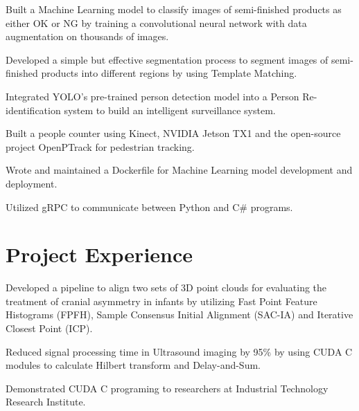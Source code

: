 \documentclass[]{deedy-resume}
\begin{document}
\begin{minipage}[t]{0.66\textwidth}
\begin{tightemize}
\item Built a Machine Learning model to classify images of semi-finished products as either OK or NG 
by training a convolutional neural network with data augmentation on thousands of images.
\item Developed a simple but effective segmentation process to segment images of semi-finished products into different regions by using Template Matching.
\item Integrated YOLO's pre-trained person detection model into a Person Re-identification system to build an intelligent surveillance system.
\item Built a people counter using Kinect, NVIDIA Jetson TX1 and the open-source project OpenPTrack for pedestrian tracking.
\item Wrote and maintained a Dockerfile for Machine Learning model development and deployment.
\item Utilized gRPC to communicate between Python and C\# programs.
\end{tightemize}

\section{Project Experience}

\begin{tightemize}
\item Developed a pipeline to align two sets of 3D point clouds for evaluating the treatment of cranial asymmetry in infants
by utilizing Fast Point Feature Histograms (FPFH), Sample Consensus Initial Alignment (SAC-IA) and Iterative Closest Point (ICP).
\end{tightemize}
\sectionsep

\begin{tightemize}
\item Reduced signal processing time in Ultrasound imaging by 95\% by using CUDA C modules to calculate Hilbert transform and Delay-and-Sum.
\item Demonstrated CUDA C programing to researchers at Industrial Technology Research Institute.
\end{tightemize}

\end{minipage}
\end{document}
